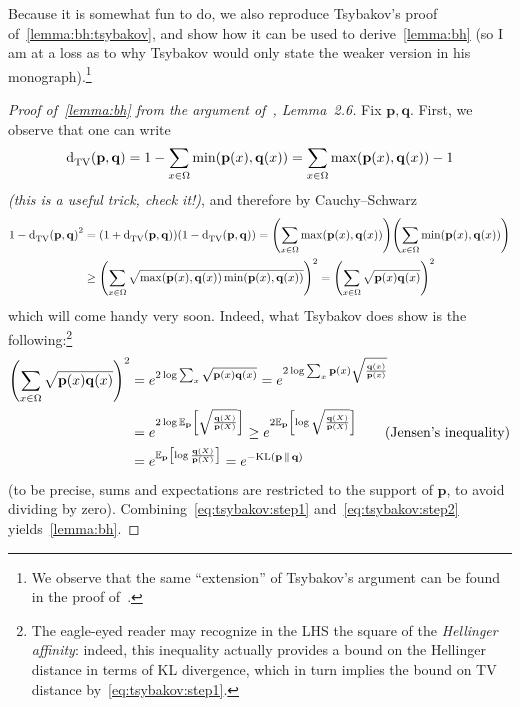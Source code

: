 \documentclass[10pt]{article}
\newcommand{\p}{\mathbf{p}}
\newcommand{\q}{\mathbf{q}}
\begin{document}
Because it is somewhat fun to do, we also reproduce Tsybakov's proof of~\autoref{lemma:bh:tsybakov}, and show how it can be used to derive~\autoref{lemma:bh} (so I am at a loss as to why Tsybakov would only state the weaker version in his monograph).\footnote{We observe that the same ``extension'' of Tsybakov's argument can be found in the proof of~\cite[Lemma 6]{GaoHRZ19}.}
\begin{proof}[Proof of~\autoref{lemma:bh} from the argument of~\cite{Tsybakov09}, Lemma~2.6]
Fix $\p,\q$. First, we observe that one can write 
\begin{equation}
  \totalvardist{\p}{\q}=1-\sum_{x\in\domain} \min(\p(x),\q(x)) = \sum_{x\in\domain} \max(\p(x),\q(x)) - 1
\end{equation}
\emph{(this is a useful trick, check it!)}, and therefore by Cauchy--Schwarz
\begin{align}
    1-\totalvardist{\p}{\q}^2 
    &= (1+\totalvardist{\p}{\q})(1-\totalvardist{\p}{\q})
    = \mleft(\sum_{x\in\domain} \max(\p(x),\q(x))\mright)\mleft(\sum_{x\in\domain} \min(\p(x),\q(x))\mright) \notag\\
    &\geq \mleft(\sum_{x\in\domain} \sqrt{\max(\p(x),\q(x))\min(\p(x),\q(x))}\mright)^2
    = \mleft(\sum_{x\in\domain} \sqrt{\p(x)\q(x)}\mright)^2 \label{eq:tsybakov:step1}
\end{align}
which will come handy very soon. Indeed, what Tsybakov does show is the following:\footnote{The eagle-eyed reader may recognize in the LHS the square of the \emph{Hellinger affinity}: indeed, this inequality actually provides a bound on the Hellinger distance in terms of KL divergence, which in turn implies the bound on TV distance by~\eqref{eq:tsybakov:step1}.}
\begin{align}
    \mleft(\sum_{x\in\domain} \sqrt{\p(x)\q(x)}\mright)^2
    &= e^{2\log \sum_{x} \sqrt{\p(x)\q(x)}}
    = e^{2\log \sum_{x} \p(x)\sqrt{\frac{\q(x)}{\p(x)}}} \notag\\
    &= e^{2\log \shortexpect_\p\mleft[\sqrt{\frac{\q(X)}{\p(X)}}\mright]} 
    \geq e^{2\shortexpect_\p\mleft[\log \sqrt{\frac{\q(X)}{\p(X)}}\mright]} \tag{Jensen's inequality}\notag\\
    &= e^{\shortexpect_\p\mleft[\log \frac{\q(X)}{\p(X)}\mright]} 
    = e^{-\kldiv{\p}{\q}} \label{eq:tsybakov:step2}
\end{align}
(to be precise, sums and expectations are restricted to the support of $\p$, to avoid dividing by zero). Combining~\eqref{eq:tsybakov:step1} and~\eqref{eq:tsybakov:step2} yields~\autoref{lemma:bh}.
\end{proof}
\end{document}
